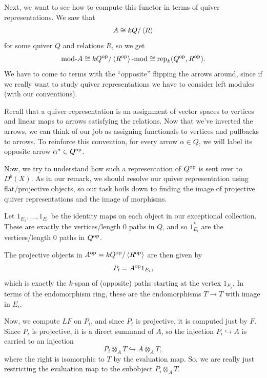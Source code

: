 \documentclass[12pt]{article}
\begin{document}
Next, we want to see how to compute this functor in terms of quiver representations. We saw that
\[A \cong kQ/\left\langle R\right\rangle\]
for some quiver $Q$ and relations $R$, so we get
\[\mathrm{mod}\text{-} A \cong kQ^{\mathrm{op}}/\left\langle R^{\mathrm{op}}\right\rangle \text{-}\mathrm{mod} \cong \mathrm{rep}_k(Q^{\mathrm{op}},R^{\mathrm{op}}).\]
We have to come to terms with the ``opposite'' flipping the arrows around, since if we really want to study quiver representations we have to consider left modules (with our conventions).

Recall that a quiver representation is an assignment of vector spaces to vertices and linear maps to arrows satisfying the relations. Now that we've inverted the arrows, we can think of our job as assigning functionals to vertices and pullbacks to arrows. To reinforce this convention, for every arrow $\alpha \in Q$, we will label its opposite arrow $\alpha^* \in Q^{\mathrm{op}}$.

Now, we try to understand how such a representation of $Q^{\mathrm{op}}$ is sent over to $D^b(X)$. As in our remark, we should resolve our quiver representation using flat/projective objects, so our task boils down to finding the image of projective quiver representations and the image of morphisms.

Let $1_{E_1},\dots,1_{E_r}$ be the identity maps on each object in our exceptional collection. These are exactly the vertices/length 0 paths in $Q$, and so $1_{E_i}^*$ are the vertices/length 0 paths in $Q^{\mathrm{op}}$.

The projective objects in $A^{\mathrm{op}} = kQ^{\mathrm{op}}/\left\langle R^{\mathrm{op}}\right\rangle$ are then given by
\[P_i = A^{\mathrm{op}} 1_{E_i},\]
which is exactly the $k$-span of (opposite) paths starting at the vertex $1_{E_i}$. In terms of the endomorphism ring, these are the endomorphisms $T\to T$ with image in $E_i$.

Now, we compute $LF$ on $P_i$, and since $P_i$ is projective, it is computed just by $F$. Since $P_i$ is projective, it is a direct summand of $A$, so the injection $P_i \hookrightarrow A$ is carried to an injection
\[P_i \otimes_A T \hookrightarrow A \otimes_A T,\]
where the right is isomorphic to $T$ by the evaluation map. So, we are really just restricting the evaluation map to the subobject $P_i \otimes_A T$.
\end{document}
